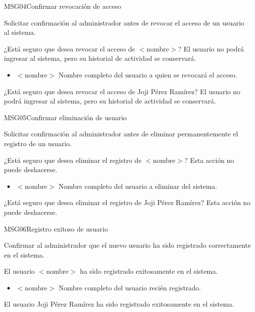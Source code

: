 
\begin{cdtMessage}[msgWarningColor]{MSG04}{Confirmar revocación de acceso}
	\item[Propósito:] Solicitar confirmación al administrador 
	antes de revocar el acceso de un usuario al sistema.
	\item[Redacción:] ¿Está seguro que desea revocar el acceso 
	de $<$nombre$>$? El usuario no podrá ingresar al sistema, 
	pero su historial de actividad se conservará.
	\item[Parámetros:] \hspace{1cm}
	\begin{itemize}
		\item $<$nombre$>$ Nombre completo del usuario 
		a quien se revocará el acceso.
	\end{itemize}
	\item[Ejemplos:] ¿Está seguro que desea revocar el acceso 
	de Joji Pérez Ramírez? El usuario no podrá ingresar al 
	sistema, pero su historial de actividad se conservará.
\end{cdtMessage}

\begin{cdtMessage}[msgWarningColor]{MSG05}{Confirmar eliminación de usuario}
	\item[Propósito:] Solicitar confirmación al administrador 
	antes de eliminar permanentemente el registro de un usuario.
	\item[Redacción:] ¿Está seguro que desea eliminar el registro 
	de $<$nombre$>$? Esta acción no puede deshacerse.
	\item[Parámetros:] \hspace{1cm}
	\begin{itemize}
		\item $<$nombre$>$ Nombre completo del usuario 
		a eliminar del sistema.
	\end{itemize}
	\item[Ejemplos:] ¿Está seguro que desea eliminar el registro 
	de Joji Pérez Ramírez? Esta acción no puede deshacerse.
\end{cdtMessage}

\begin{cdtMessage}[msgInfoColor]{MSG06}{Registro exitoso de usuario}
	\item[Propósito:] Confirmar al administrador que el nuevo 
	usuario ha sido registrado correctamente en el sistema.
	\item[Redacción:] El usuario $<$nombre$>$ ha sido registrado 
	exitosamente en el sistema.
	\item[Parámetros:] \hspace{1cm}
	\begin{itemize}
		\item $<$nombre$>$ Nombre completo del usuario 
		recién registrado.
	\end{itemize}
	\item[Ejemplos:] El usuario Joji Pérez Ramírez ha sido 
	registrado exitosamente en el sistema.
\end{cdtMessage}

